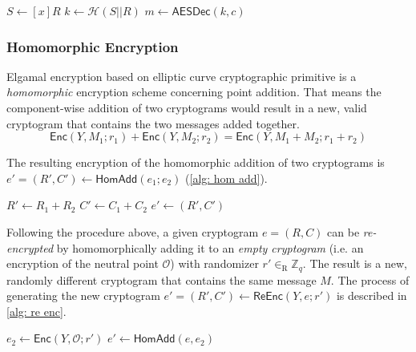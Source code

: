 \begin{algorithm}[ht]
    \DontPrintSemicolon
    \caption{$\mathsf{TxtDec} (x, e)$}
    \label{alg: txt dec}
    
    $S \gets [x]R$ \;
    $k \gets \mathcal{H} (S || R)$ \;
    $m \gets \mathsf{AESDec} (k, c)$ \;
     
\end{algorithm}


\subsubsection{Homomorphic Encryption}
Elgamal encryption based on elliptic curve cryptographic primitive is a \textit{homomorphic} encryption scheme concerning point addition. That means the component-wise addition of two cryptograms would result in a new, valid cryptogram that contains the two messages added together.
\[
\mathsf{Enc}(Y, M_1; r_1) + \mathsf{Enc}(Y, M_2; r_2) = \mathsf{Enc}(Y, M_1 + M_2; r_1 + r_2)
\]

The resulting encryption of the homomorphic addition of two cryptograms is $e' = (R', C') \gets \mathsf{HomAdd} (e_1; e_2)$ (\cref{alg: hom add}).

\begin{algorithm}[ht]
    \DontPrintSemicolon
    \caption{$\mathsf{HomAdd}(e_1; e_2)$}
    \label{alg: hom add}
    
    $R' \gets R_1 + R_2$ \;
    $C' \gets C_1 + C_2$ \;
    $e' \gets (R', C')$\;
     
\end{algorithm}

Following the procedure above, a given cryptogram $e = (R, C)$ can be \textit{re-encrypted} by homomorphically adding it to an \textit{empty cryptogram} (i.e. an encryption of the neutral point $\mathcal{O}$) with randomizer $r' \in_\mathrm{R} \mathbb{Z}_q$. The result is a new, randomly different cryptogram that contains the same message $M$. The process of generating the new cryptogram $e' = (R', C') \gets \mathsf{ReEnc} (Y, e; r')$ is described in \cref{alg: re enc}.

\begin{algorithm}[ht]
    \DontPrintSemicolon
    \caption{$\mathsf{ReEnc} (Y, e; r')$}
    \label{alg: re enc}
    
    $e_2 \gets \mathsf{Enc}(Y, \mathcal{O}; r')$ 
    $e' \gets \mathsf{HomAdd} (e, e_2)$ 
     
\end{algorithm}

